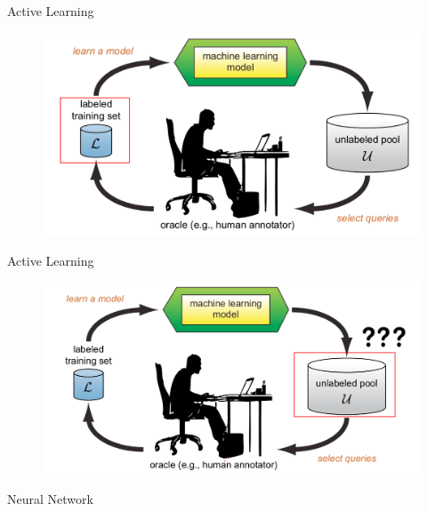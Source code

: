 \documentclass[10pt]{beamer}
\begin{document}
\begin{frame}[fragile]{Active Learning}
    \begin{figure}[htp]
        \centering
        \includegraphics[scale=0.3]{images/active_learning_labeled.png}
    \end{figure}
\end{frame}

\begin{frame}[fragile]{Active Learning}
    \begin{figure}[htp]
        \centering
        \includegraphics[scale=0.3]{images/active_learning_uncertainty.png}
    \end{figure}
\end{frame}

\begin{frame}[fragile]{Neural Network}
    
\end{frame}
\end{document}
